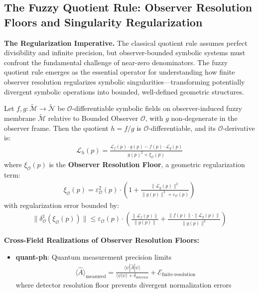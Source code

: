 \subsection{The Fuzzy Quotient Rule: Observer Resolution Floors and Singularity Regularization}
\label{subsec:bk4_fuzzy_quotient_rule}

\textbf{The Regularization Imperative.} The classical quotient rule assumes perfect divisibility and infinite precision, but observer-bounded symbolic systems must confront the fundamental challenge of near-zero denominators. The fuzzy quotient rule emerges as the essential operator for understanding how finite observer resolution regularizes symbolic singularities—transforming potentially divergent symbolic operations into bounded, well-defined geometric structures.

\begin{theorem}
\label{theorem:bk4_fuzzy_quotient_rule}
Let $f, g: \tilde{\mathcal{M}} \rightarrow \tilde{\mathcal{N}}$ be $\mathcal{O}$-differentiable symbolic fields on observer-induced fuzzy membrane $\tilde{\mathcal{M}}$ relative to Bounded Observer $\mathcal{O}$, with $g$ non-degenerate in the observer frame. Then the quotient $h = f/g$ is $\mathcal{O}$-differentiable, and its $\mathcal{O}$-derivative is:
\begin{align}
\mathcal{L}_h(p) = \frac{\mathcal{L}_f(p) \cdot g(p) - f(p) \cdot \mathcal{L}_g(p)}{g(p)^2 + \xi_{\mathcal{O}}(p)}
\end{align}
where $\xi_{\mathcal{O}}(p)$ is the \textbf{Observer Resolution Floor}, a geometric regularization term:
\begin{align}
\xi_{\mathcal{O}}(p) = \varepsilon_{\mathcal{O}}^2(p) \cdot \left(1 + \frac{\|\mathcal{L}_g(p)\|^2}{\|g(p)\|^2 + \varepsilon_{\mathcal{O}}(p)}\right)
\end{align}
with regularization error bounded by:
\begin{align}
\|\delta^1_{\mathcal{O}}(\xi_{\mathcal{O}}(p))\| \leq \varepsilon_{\mathcal{O}}(p) \cdot \left(\frac{\|\mathcal{L}_f(p)\|}{\|g(p)\|} + \frac{\|f(p)\| \cdot \|\mathcal{L}_g(p)\|}{\|g(p)\|^2}\right)
\end{align}

\textbf{Cross-Field Realizations of Observer Resolution Floors:}

\begin{itemize}
\item \textbf{quant-ph}: Quantum measurement precision limits
  \begin{align}
  \langle \hat{A} \rangle_{\text{measured}} = \frac{\langle \psi | \hat{A} | \psi \rangle}{\langle \psi | \psi \rangle + \delta_{\text{detector}}} + \mathcal{E}_{\text{finite-resolution}}
  \end{align}
  where detector resolution floor prevents divergent normalization errors
  

\end{itemize}
\end{theorem}
